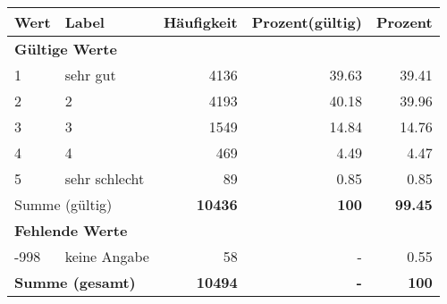      \begin{longtable}{lXrrr}
     \toprule
     \textbf{Wert} & \textbf{Label} & \textbf{Häufigkeit} & \textbf{Prozent(gültig)} & \textbf{Prozent} \\
     \endhead
     \midrule
     \multicolumn{5}{l}{\textbf{Gültige Werte}}\\

     1 &
     \multicolumn{1}{X}{ sehr gut   } &


       \num{4136} &
       \num[round-mode=places,round-precision=2]{39,63} &
         \num[round-mode=places,round-precision=2]{39,41} \\

     2 &
     \multicolumn{1}{X}{ 2   } &


       \num{4193} &
       \num[round-mode=places,round-precision=2]{40,18} &
         \num[round-mode=places,round-precision=2]{39,96} \\

     3 &
     \multicolumn{1}{X}{ 3   } &


       \num{1549} &
       \num[round-mode=places,round-precision=2]{14,84} &
         \num[round-mode=places,round-precision=2]{14,76} \\

     4 &
     \multicolumn{1}{X}{ 4   } &


       \num{469} &
       \num[round-mode=places,round-precision=2]{4,49} &
         \num[round-mode=places,round-precision=2]{4,47} \\

     5 &
     \multicolumn{1}{X}{ sehr schlecht   } &


       \num{89} &
       \num[round-mode=places,round-precision=2]{0,85} &
         \num[round-mode=places,round-precision=2]{0,85} \\
     \midrule
     \multicolumn{2}{l}{Summe (gültig)} &
       \textbf{\num{10436}} &
     \textbf{100} &
       \textbf{\num[round-mode=places,round-precision=2]{99,45}} \\
     \multicolumn{5}{l}{\textbf{Fehlende Werte}}\\
       -998 &
       keine Angabe &
         \num{58} &
        - &
         \num[round-mode=places,round-precision=2]{0,55} \\
     \midrule
     \multicolumn{2}{l}{\textbf{Summe (gesamt)}} &
          \textbf{\num{10494}} &
        \textbf{-} &
        \textbf{100} \\
     \bottomrule
     \end{longtable}
     
